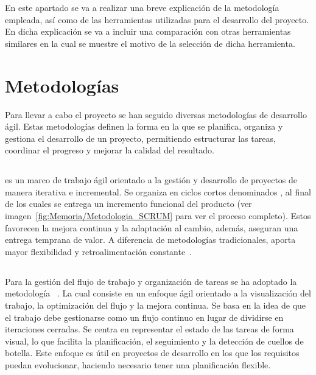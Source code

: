 En este apartado se va a realizar una breve explicación de la metodología empleada, así como de las herramientas utilizadas para el desarrollo del proyecto. En dicha explicación se va a incluir una comparación con otras herramientas similares en la cual se muestre el motivo de la selección de dicha herramienta. 
\section{Metodologías}
Para llevar a cabo el proyecto se han seguido diversas metodologías de desarrollo ágil. Estas metodologías definen la forma en la que se planifica, organiza y gestiona el desarrollo de un proyecto, permitiendo estructurar las tareas, coordinar el progreso y mejorar la calidad del resultado.

\subsection{}
 es un marco de trabajo ágil orientado a la gestión y desarrollo de proyectos de manera iterativa e incremental. Se organiza en ciclos cortos denominados , al final de los cuales se entrega un incremento funcional del producto (ver imagen~\ref{fig:Memoria/Metodologia_SCRUM} para ver el proceso  completo). Estos  favorecen la mejora continua y la adaptación al cambio, además, aseguran una entrega temprana de valor. A diferencia de metodologías tradicionales,  aporta mayor flexibilidad y retroalimentación constante~\cite{scrum:guide}. 


\subsection{}
Para la gestión del flujo de trabajo y organización de tareas se ha adoptado la metodología ~\cite{herramienta:kanban}. La cual consiste en un enfoque ágil orientado a la visualización del trabajo, la optimización del flujo y la mejora continua. Se basa en la idea de que el trabajo debe gestionarse como un flujo continuo en lugar de dividirse en iteraciones cerradas. Se centra en representar el estado de las tareas de forma visual, lo que facilita la planificación, el seguimiento y la detección de cuellos de botella. Este enfoque es útil en proyectos de desarrollo  en los que los requisitos puedan evolucionar, haciendo necesario tener una planificación flexible.

